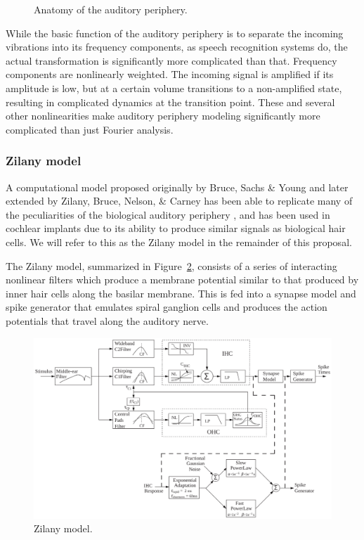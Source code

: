 \documentclass{article}
\begin{document}
\begin{figure}
  \begin{center}
  \end{center}
  \caption{Anatomy of the auditory periphery.}
  \label{fig:anatomy}
\end{figure}

While the basic function of the auditory periphery
is to separate the incoming vibrations
into its frequency components,
as speech recognition systems do,
the actual transformation is significantly
more complicated than that.
Frequency components are nonlinearly weighted.
The incoming signal is amplified
if its amplitude is low,
but at a certain volume transitions
to a non-amplified state,
resulting in complicated dynamics
at the transition point.
These and several other nonlinearities
make auditory periphery modeling
significantly more complicated
than just Fourier analysis.

\subsubsection{Zilany model} \label{subsec:zilany}

A computational model proposed originally by
Bruce, Sachs \& Young
and later extended by Zilany, Bruce, Nelson, \& Carney
has been able to replicate
many of the peculiarities
of the biological auditory periphery
\citep{bruce2003,zilany2006,zilany2007,zilany2009,zilany2014},
and has been used in cochlear implants
due to its ability to produce
similar signals as biological hair cells.
We will refer to this as the
Zilany model in the remainder of this proposal.

The Zilany model,
summarized in Figure~\ref{fig:zilany},
consists of a series
of interacting nonlinear filters
which produce a membrane potential
similar to that produced
by inner hair cells along the basilar membrane.
This is fed into a synapse model and spike generator
that emulates spiral ganglion cells
and produces the action potentials
that travel along the auditory nerve.

\begin{figure}
  \begin{center}
    \includegraphics[width=1\linewidth]{zilany}
  \end{center}
  \caption{Zilany model.}
  \label{fig:zilany}
\end{figure}
\end{document}
